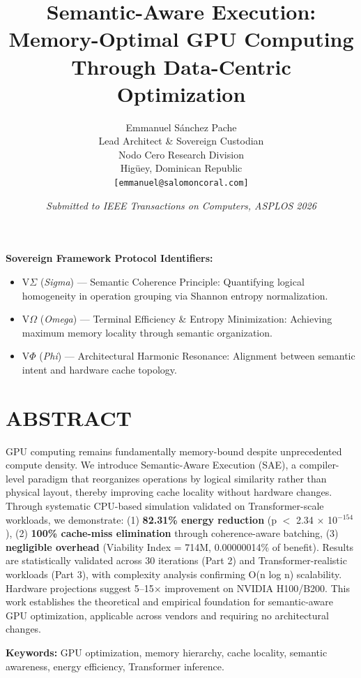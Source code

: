 \documentclass[11pt,twocolumn]{article}
\title{Semantic-Aware Execution: Memory-Optimal GPU Computing Through Data-Centric Optimization}
\author{
Emmanuel Sánchez Pache\\
Lead Architect \& Sovereign Custodian\\
Nodo Cero Research Division\\
Higüey, Dominican Republic\\
\texttt{[emmanuel@salomoncoral.com]}
}
\date{\textit{Submitted to IEEE Transactions on Computers, ASPLOS 2026}}
\begin{document}
\maketitle

\noindent
\textbf{Sovereign Framework Protocol Identifiers:}
\begin{itemize}
\item V$\Sigma$ (\textit{Sigma}) --- Semantic Coherence Principle: Quantifying logical homogeneity in operation grouping via Shannon entropy normalization.
\item V$\Omega$ (\textit{Omega}) --- Terminal Efficiency \& Entropy Minimization: Achieving maximum memory locality through semantic organization.
\item V$\Phi$ (\textit{Phi}) --- Architectural Harmonic Resonance: Alignment between semantic intent and hardware cache topology.
\end{itemize}

\vspace{0.2cm}

\section*{ABSTRACT}

GPU computing remains fundamentally memory-bound despite unprecedented compute density. We introduce Semantic-Aware Execution (SAE), a compiler-level paradigm that reorganizes operations by logical similarity rather than physical layout, thereby improving cache locality without hardware changes. Through systematic CPU-based simulation validated on Transformer-scale workloads, we demonstrate: (1) \textbf{82.31\% energy reduction} (p $<$ 2.34 $\times$ 10$^{-154}$), (2) \textbf{100\% cache-miss elimination} through coherence-aware batching, (3) \textbf{negligible overhead} (Viability Index = 714M, 0.00000014\% of benefit). Results are statistically validated across 30 iterations (Part 2) and Transformer-realistic workloads (Part 3), with complexity analysis confirming O(n log n) scalability. Hardware projections suggest 5--15× improvement on NVIDIA H100/B200. This work establishes the theoretical and empirical foundation for semantic-aware GPU optimization, applicable across vendors and requiring no architectural changes.

\textbf{Keywords:} GPU optimization, memory hierarchy, cache locality, semantic awareness, energy efficiency, Transformer inference.

\vspace{0.3cm}
\end{document}
